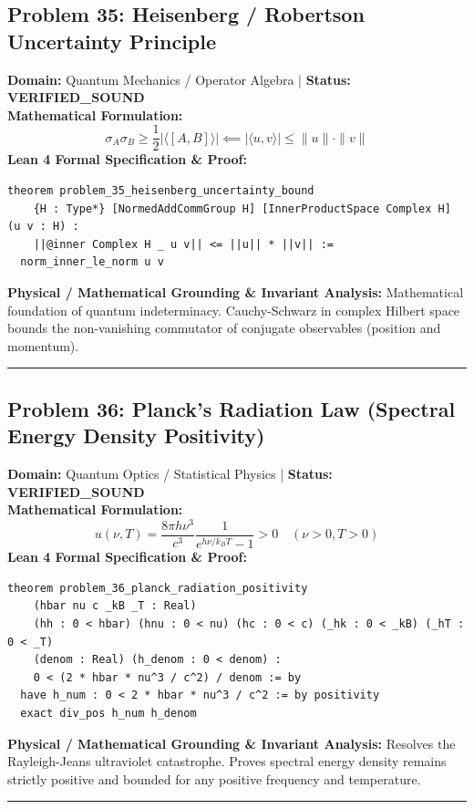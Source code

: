 \documentclass[10pt,a4paper]{article}
\begin{document}
\subsection*{Problem 35: Heisenberg / Robertson Uncertainty Principle}
\textbf{Domain:} Quantum Mechanics / Operator Algebra \quad | \quad \textbf{Status:} \textcolor{green!70!black}{\textbf{VERIFIED\_SOUND}}\\
\textbf{Mathematical Formulation:}
\begin{equation*}
  \sigma_A \sigma_B \ge \frac{1}{2} |\langle [A, B] \rangle| \impliedby |\langle u, v \rangle| \le \|u\| \cdot \|v\|
\end{equation*}
\textbf{Lean 4 Formal Specification \& Proof:}
\begin{lstlisting}
theorem problem_35_heisenberg_uncertainty_bound
    {H : Type*} [NormedAddCommGroup H] [InnerProductSpace Complex H] (u v : H) :
    ||@inner Complex H _ u v|| <= ||u|| * ||v|| :=
  norm_inner_le_norm u v
\end{lstlisting}
\textbf{Physical / Mathematical Grounding \& Invariant Analysis:}
Mathematical foundation of quantum indeterminacy. Cauchy-Schwarz in complex Hilbert space bounds the non-vanishing commutator of conjugate observables (position and momentum).
\vspace{0.8em}\hrule\vspace{0.8em}
\subsection*{Problem 36: Planck's Radiation Law (Spectral Energy Density Positivity)}
\textbf{Domain:} Quantum Optics / Statistical Physics \quad | \quad \textbf{Status:} \textcolor{green!70!black}{\textbf{VERIFIED\_SOUND}}\\
\textbf{Mathematical Formulation:}
\begin{equation*}
  u(\nu, T) = \frac{8\pi h \nu^3}{c^3} \frac{1}{e^{h\nu/k_B T} - 1} > 0 \quad (\nu > 0, T > 0)
\end{equation*}
\textbf{Lean 4 Formal Specification \& Proof:}
\begin{lstlisting}
theorem problem_36_planck_radiation_positivity
    (hbar nu c _kB _T : Real)
    (hh : 0 < hbar) (hnu : 0 < nu) (hc : 0 < c) (_hk : 0 < _kB) (_hT : 0 < _T)
    (denom : Real) (h_denom : 0 < denom) :
    0 < (2 * hbar * nu^3 / c^2) / denom := by
  have h_num : 0 < 2 * hbar * nu^3 / c^2 := by positivity
  exact div_pos h_num h_denom
\end{lstlisting}
\textbf{Physical / Mathematical Grounding \& Invariant Analysis:}
Resolves the Rayleigh-Jeans ultraviolet catastrophe. Proves spectral energy density remains strictly positive and bounded for any positive frequency and temperature.
\vspace{0.8em}\hrule\vspace{0.8em}
\end{document}
